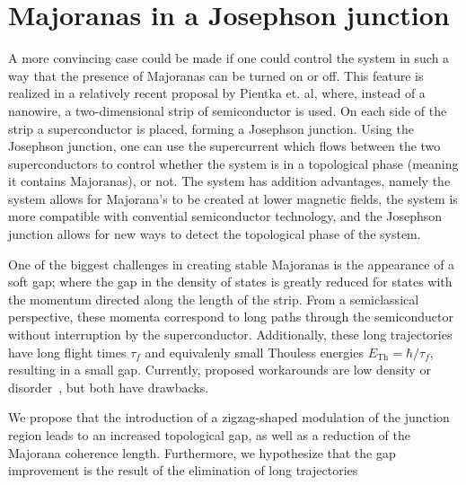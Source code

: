 \section{Majoranas in a Josephson junction}
	A more convincing case could be made if one could control the system in such a way that the presence of Majoranas can be turned on or off.
	This feature is realized in a relatively recent proposal by Pientka et. al\cite{pientka_topological_2017}, where, instead of a nanowire, a two-dimensional strip of semiconductor is used.
	On each side of the strip a superconductor is placed, forming a Josephson junction.
	Using the Josephson junction, one can use the supercurrent which flows between the two superconductors to control whether the system is in a topological phase (meaning it contains Majoranas), or not.
	The system has addition advantages, namely the system allows for Majorana's to be created at lower magnetic fields, the system is more compatible with convential semiconductor technology, and the Josephson junction allows for new ways to detect the topological phase of the system.


	One of the biggest challenges in creating stable Majoranas is the appearance of a soft gap; where the gap in the density of states is greatly reduced for states with the momentum directed along the length of the strip.
	From a semiclassical perspective, these momenta correspond to long paths through the semiconductor without interruption by the superconductor.
	Additionally, these long trajectories have long flight times $\tau_f$ and equivalenly small Thouless energies $E_{\textrm{Th}}=\hbar / \tau_f$, resulting in a small gap. 
	Currently, proposed workarounds are low density or disorder~\cite{haim_double-edge_2018}, but both have drawbacks.


	We propose that the introduction of a zigzag-shaped modulation of the junction region leads to an increased topological gap, as well as a reduction of the Majorana coherence length.
	Furthermore, we hypothesize that the gap improvement is the result of the elimination of long trajectories